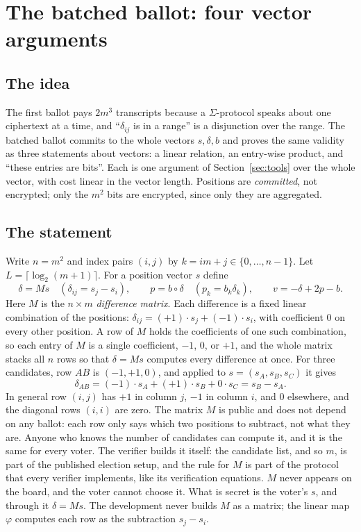 \documentclass[11pt,a4paper]{article}
\theoremstyle{remark}
\begin{document}
\section{The batched ballot: four vector arguments}\label{sec:ballot2}

\subsection{The idea}
The first ballot pays $2m^3$ transcripts because a $\Sigma$-protocol speaks
about one ciphertext at a time, and ``$\delta_{ij}$ is in a range'' is a
disjunction over the range. The batched ballot commits to the whole vectors
$s, \delta, b$ and proves the same validity as three statements about
vectors: a linear relation, an entry-wise product, and ``these entries are
bits''. Each is one argument of Section~\ref{sec:tools} over the whole
vector, with cost linear in the vector length. Positions are
\emph{committed}, not encrypted; only the $m^2$ bits are encrypted, since
only they are aggregated.

\subsection{The statement}
Write $n = m^2$ and index pairs $(i, j)$ by $k = i m + j \in \{0, \ldots, n
- 1\}$. Let $L = \lceil \log_2(m + 1) \rceil$. For a position vector $s$
define
\[
  \delta = M s \quad (\delta_{ij} = s_j - s_i), \qquad
  p = b \circ \delta \quad (p_k = b_k \delta_k), \qquad
  v = -\delta + 2p - b .
\]
Here $M$ is the $n \times m$ \emph{difference matrix}. Each difference
is a fixed linear combination of the positions: $\delta_{ij} = (+1)\cdot s_j
+ (-1)\cdot s_i$, with coefficient $0$ on every other position. A row of
$M$ holds the coefficients of one such combination, so each entry of $M$ is
a single coefficient, $-1$, $0$, or $+1$, and the whole matrix stacks all
$n$ rows so that $\delta = M s$ computes every difference at once. For
three candidates, row $AB$ is $(-1, +1, 0)$, and applied to $s = (s_A,
s_B, s_C)$ it gives
\[
  \delta_{AB} = (-1)\cdot s_A + (+1)\cdot s_B + 0 \cdot s_C = s_B - s_A .
\]
In general row $(i, j)$ has $+1$ in column $j$, $-1$ in column $i$, and
$0$ elsewhere, and the diagonal rows $(i, i)$ are zero. The matrix $M$ is public and does not depend on any ballot: each row
only says which two positions to subtract, not what they are. Anyone who
knows the number of candidates can compute it, and it is the same for
every voter. The verifier builds it itself: the candidate list, and so
$m$, is part of the published election setup, and the rule for $M$ is part
of the protocol that every verifier implements, like its verification
equations. $M$ never appears on the board, and the voter cannot choose it.
What is secret is the voter's $s$, and through it $\delta = Ms$. The
development never builds $M$ as a matrix; the linear map $\varphi$
computes each row as the subtraction $s_j - s_i$.
\end{document}
